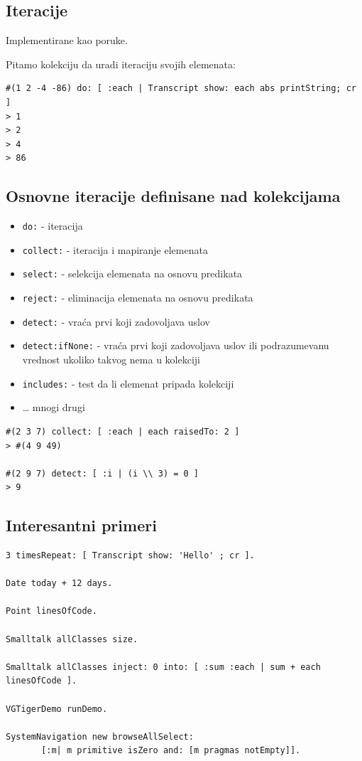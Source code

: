 \documentclass[presentation]{beamer}
\begin{document}
\subsection{Iteracije}
\label{sec:org76f9e4b}

Implementirane kao poruke.

Pitamo kolekciju da uradi iteraciju svojih elemenata:

\begin{verbatim}
#(1 2 -4 -86) do: [ :each | Transcript show: each abs printString; cr ]
> 1
> 2
> 4
> 86
\end{verbatim}

\subsection{Osnovne iteracije definisane nad kolekcijama}
\label{sec:orgad3ff23}

\begin{itemize}
\item \texttt{do:} - iteracija
\item \texttt{collect:} - iteracija i mapiranje elemenata
\item \texttt{select:} - selekcija elemenata na osnovu predikata
\item \texttt{reject:} - eliminacija elemenata na osnovu predikata
\item \texttt{detect:} - vraća prvi koji zadovoljava uslov
\item \texttt{detect:ifNone:} - vraća prvi koji zadovoljava uslov ili podrazumevanu
vrednost ukoliko takvog nema u kolekciji
\item \texttt{includes:} - test da li elemenat pripada kolekciji
\item \ldots{} mnogi drugi
\end{itemize}

\begin{verbatim}
#(2 3 7) collect: [ :each | each raisedTo: 2 ]
> #(4 9 49)

#(2 9 7) detect: [ :i | (i \\ 3) = 0 ]
> 9
\end{verbatim}

\subsection{Interesantni primeri}
\label{sec:orgc411395}

\begin{verbatim}
3 timesRepeat: [ Transcript show: 'Hello' ; cr ].

Date today + 12 days.

Point linesOfCode.

Smalltalk allClasses size.

Smalltalk allClasses inject: 0 into: [ :sum :each | sum + each linesOfCode ].

VGTigerDemo runDemo.

SystemNavigation new browseAllSelect:
       [:m| m primitive isZero and: [m pragmas notEmpty]].
\end{verbatim}
\end{document}
